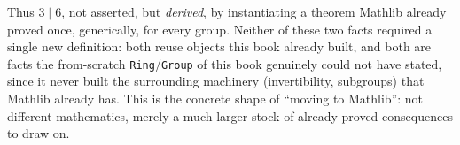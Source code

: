 Thus \(3 \mid 6\), not asserted, but \emph{derived}, by instantiating a theorem Mathlib already proved once, generically, for every group. Neither of these two facts required a single new definition: both reuse objects this book already built, and both are facts the from-scratch \texttt{Ring}/\texttt{Group} of this book genuinely could not have stated, since it never built the surrounding machinery (invertibility, subgroups) that Mathlib already has. This is the concrete shape of ``moving to Mathlib'': not different mathematics, merely a much larger stock of already-proved consequences to draw on.

